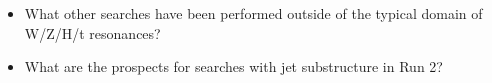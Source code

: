 \label{othersearches}

\begin{itemize}
\item What other searches have been performed outside of the typical domain of W/Z/H/t resonances? 
\item What are the prospects for searches with jet substructure in Run 2?
\end{itemize}
